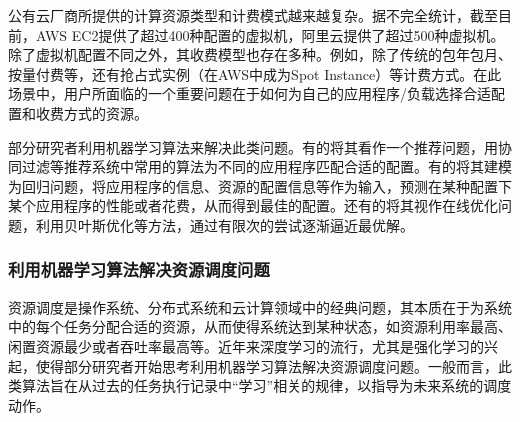 公有云厂商所提供的计算资源类型和计费模式越来越复杂。据不完全统计，截至目前，AWS EC2提供了超过400种配置的虚拟机，阿里云提供了超过500种虚拟机。除了虚拟机配置不同之外，其收费模型也存在多种。例如，除了传统的包年包月、按量付费等，还有抢占式实例（在AWS中成为Spot Instance）\parencite{awsspot}等计费方式。在此场景中，用户所面临的一个重要问题在于如何为自己的应用程序/负载选择合适配置和收费方式的资源。

部分研究者利用机器学习算法来解决此类问题。有的将其看作一个推荐问题\parencite{klimovic2018selecta}，用协同过滤等推荐系统中常用的算法为不同的应用程序匹配合适的配置。有的将其建模为回归问题\parencite{yadwadkar2017selecting,venkataraman2016ernest,moradi2019performance,zheng2019online}，将应用程序的信息、资源的配置信息等作为输入，预测在某种配置下某个应用程序的性能或者花费，从而得到最佳的配置。还有的将其视作在线优化问题\parencite{alipourfard2017cherrypick,casimiro2019lynceus}，利用贝叶斯优化等方法，通过有限次的尝试逐渐逼近最优解。

\subsubsection{利用机器学习算法解决资源调度问题}

资源调度是操作系统、分布式系统和云计算领域中的经典问题，其本质在于为系统中的每个任务分配合适的资源，从而使得系统达到某种状态，如资源利用率最高、闲置资源最少或者吞吐率最高等。近年来深度学习的流行，尤其是强化学习的兴起，使得部分研究者开始思考利用机器学习算法解决资源调度问题\parencite{delimitrou2014quasar,mao2019learning,chung2018stratus}。一般而言，此类算法旨在从过去的任务执行记录中“学习”相关的规律，以指导为未来系统的调度动作。
